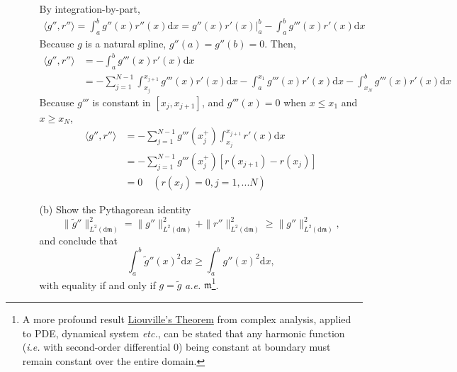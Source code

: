 \documentclass[10pt]{article}
\theoremstyle{definition}
\theoremstyle{remark}
\newcommand{\fm}{\mathfrak{m}}
\newcommand{\rd}{\mathrm{d}}		%
\begin{document}
\begin{enumerate}
\begin{itemize}
		By integration-by-part,
		\begin{align*}
		\langle g'',r'' \rangle = \int_{a}^{b}g''(x)r''(x)\rd x = g''(x)r'(x) |^b_a - \int_{a}^{b}g'''(x)r'(x)\rd x
		\end{align*}
		Because $g$ is a natural spline, $g''(a) = g''(b) = 0$. Then,
		\begin{align*}
		\langle g'',r'' \rangle & = - \int_{a}^{b}g'''(x)r'(x)\rd x \\
		& = - \sum_{j=1}^{N-1} \int_{x_j}^{x_{j+1}}g'''(x)r'(x)\rd x - \int_{a}^{x_1}g'''(x)r'(x)\rd x - \int_{x_N}^{b}g'''(x)r'(x)\rd x 
		\end{align*}
		Because $g'''$ is constant in $[x_j,x_{j+1}]$, and $g'''(x)=0$ when $x \le x_1 $ and $x \ge x_N$,
		\begin{align*}
		\langle g'',r'' \rangle & = - \sum_{j=1}^{N-1} g'''(x_j^+)\int_{x_j}^{x_{j+1}}r'(x)\rd x  \\
		& = - \sum_{j=1}^{N-1} g'''(x_j^+)[r(x_{j+1}) - r(x_j)] \\
		& = 0 \quad (r(x_j) = 0, j=1,...N)
		\end{align*}
	
		\item [(b)] Show the Pythagorean identity
		\[ \|\widetilde{g}''\|_{L^{2}(\rd \fm)}^{2} = \|g''\|_{L^{2}(\rd \fm)}^{2} + \|r''\|_{L^{2}(\rd \fm)}^{2} \ge \|g''\|_{L^{2}(\rd \fm)}^{2}, \]
		and conclude that
		\[ \int_{a}^{b}\widetilde{g}''(x)^{2}\rd x \ge \int_{a}^{b}g''(x)^{2}\rd x, \]
		with equality if and only if $ g = \widetilde{g} $ \textit{a.e.} $ \fm $\footnote{A more profound result \href{https://en.wikipedia.org/wiki/Liouville\%27s_theorem_(complex_analysis)}{Liouville's Theorem} from complex analysis, applied to PDE, dynamical system \textit{etc.}, can be stated that any harmonic function (\textit{i.e.} with second-order differential 0) being constant at boundary must remain constant over the entire domain.}.
		

\end{itemize}
\end{enumerate}
\end{document}
